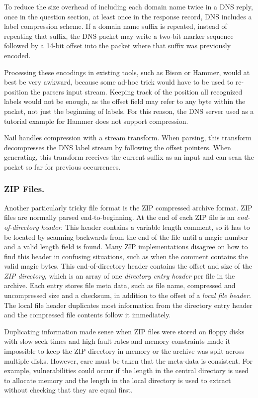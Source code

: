 To reduce the size overhead of including each domain name twice in a DNS reply, once in the
question section, at least once in the response record, DNS includes a label compression scheme. If
a domain name suffix is repeated, instead of repeating that suffix, the DNS packet may write a
two-bit marker sequence followed by a 14-bit offset into the packet where that suffix was previously
encoded.

Processing these encodings in existing tools, such as Bison or Hammer, would at best be very
awkward, because some ad-hoc trick would have to be used to re-position the parsers input stream.
Keeping track of the position all recognized labels would not be enough, as the offset field may
refer to any byte within the packet, not just the beginning of labels. For this reason, the DNS
server used as a tutorial example for Hammer does not support compression.

Nail handles compression with a stream transform. When parsing, this transform decompresses the DNS
label stream by following the offset pointers. When generating, this transform receives the current
suffix as an input and can scan the packet so far for previous occurrences. 


\subsubsection{ZIP Files.}

\label{s:eval-format-zip}
Another particularly tricky file format is the ZIP compressed archive format\cite{pkzip}.
ZIP files are normally parsed end-to-beginning. At the end of each ZIP file is an \emph{end-of-directory
header}. This header contains a variable length comment, so it has to be located by scanning
backwards from the end of the file until a magic number and a valid length field is found. Many ZIP
implementations disagree on how to find this header in confusing situations, such as when the
comment contains the valid magic bytes\cite{wolf:berlinsides-zip}.
This end-of-directory header contains the offset and size of the \emph{ZIP directory}, which is an
array of one \emph{directory entry header} per file in the archive.
Each entry stores file meta data, such as file name, compressed and uncompressed size and a checksum,
in addition to the offset of a \emph{local file header}. The local file header duplicates most
information from the directory entry header and the compressed file contents follow it immediately.

Duplicating information made sense when ZIP files were
stored on floppy disks with slow seek times and high fault rates and memory constraints made it
impossible to keep the ZIP directory in memory or the archive was split across multiple disks.
However, care must be taken that the meta-data is consistent. For example, vulnerabilities could occur
if the length in the central directory is used to allocate memory and the length in the local
directory is used to extract without checking that they are equal first. 

